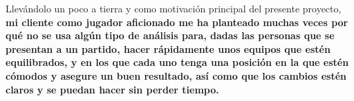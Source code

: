 Llevándolo un poco a tierra y como motivación principal del presente proyecto,
\textbf{mi cliente como jugador aficionado me ha planteado muchas veces por qué 
 no se usa algún tipo de análisis para, dadas las personas que se presentan 
 a un partido, hacer rápidamente unos equipos que estén equilibrados, y en 
 los que cada uno tenga una posición en la que estén cómodos y asegure un 
 buen resultado, así como que los cambios estén claros y se puedan hacer 
 sin perder tiempo.}
